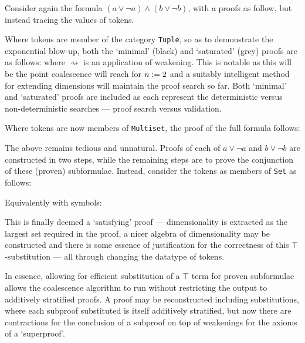     \begin{examples}
        Consider again the formula $(a \vee \neg a) \wedge (b \vee \neg b)$, with a proofs as follow, but instead tracing the values of tokens.
        
        Where tokens are member of the category \texttt{Tuple}, so as to demonstrate the exponential blow-up, both the `minimal' (black) and `saturated' (grey) proofs are as follows:
         where $\rightsquigarrow$ is an application of weakening.
        This is notable as this will be the point coalescence will reach for $n := 2$ and a suitably intelligent method for extending dimensions will maintain the proof search so far.
        Both `minimal' and `saturated' proofs are included as each represent the deterministic versus non-deterministic searches --- proof search versus validation.

        Where tokens are now members of \texttt{Multiset}, the proof of the full formula follows:
        
        The above remains tedious and unnatural.
        Proofs of each of $a \vee \neg a$ and $b \vee \neg b$ are constructed in two steps, while the remaining steps are to prove the conjunction of these (proven) subformulae.
        Instead, consider the tokens as members of \texttt{Set} as follows:

        
        
        Equivalently with symbols:
        
        This is finally deemed a `satisfying' proof --- dimensionality is extracted as the largest set required in the proof, a nicer algebra of dimensionality may be constructed and there is some essence of justification for the correctness of this $\top$-substitution --- all through changing the datatype of tokens.
    \end{examples}
    
    \begin{remark}
        In essence, allowing for efficient substitution of a $\top$ term for proven subformulae allows the coalescence algorithm to run without restricting the output to additively stratified proofs.
        A proof may be reconstructed including substitutions, where each subproof substituted is itself additively stratified, but now there are contractions for the conclusion of a subproof on top of weakenings for the axioms of a `superproof'.
    \end{remark}


